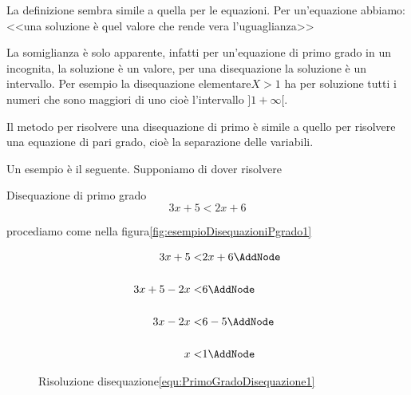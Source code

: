 La definizione sembra simile a quella per le equazioni. Per un'equazione abbiamo: <<una soluzione è quel valore che rende vera l'uguaglianza>>\par
La somiglianza è solo apparente, infatti per un'equazione di primo grado in un incognita, la soluzione è un valore, per una disequazione la soluzione è un intervallo. Per esempio la disequazione elementare$X>1$ ha per soluzione tutti i numeri che sono maggiori di uno cioè l'intervallo $]1 +\infty [$.\par
Il metodo per risolvere una disequazione di primo è simile a quello per risolvere una equazione di pari grado, cioè la separazione delle variabili.\par Un esempio è il seguente. Supponiamo di dover risolvere 
\begin{esempiot}{Disequazione di primo grado}{}
\begin{equation}
3x+5<2x+6\label{equ:PrimoGradoDisequazione1}
\end{equation}
\end{esempiot}
 procediamo come nella figura\nobs\vref{fig:esempioDisequazioniPgrado1}
\begin{figure}
	\begin{NodesList}
		\centering
		\begin{align*}
			3x+5<&2x+6\AddNode\\[.5cm] 
			3x+5-2x<&6\AddNode\\[.5cm] %
			3x-2x<&6-5\AddNode\\[.5cm]
			x<&1\AddNode
		\end{align*}
				\end{NodesList}
		\captionsetup{format=esempio,list=no}
	\caption{Risoluzione disequazione\nobs\vref{equ:PrimoGradoDisequazione1}}
	\label{fig:esempioDisequazioniPgrado1}
\end{figure}

